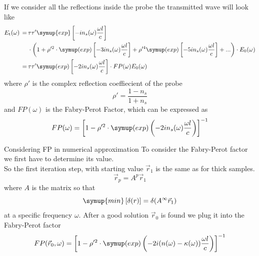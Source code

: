 \documentclass[aspectratio=1610, 9pt]{beamer}
\begin{document}
\begin{frame}
  If we consider all the reflections inside the probe the transmitted wave will look like
  \begin{align*}
    E_\text{t}(\omega) \,=\,& \tau \tau' \symup{exp} \left[-i n_s(\omega) \frac{\omega l }{c}\right] \\
                        & \cdot \left( 1 + \rho'^2 \cdot \symup(exp)\left[ -3 i n_s(\omega) \frac{\omega l }{c}\right] + \rho'^4 \symup(exp) \left[ -5 i n_s(\omega) \frac{\omega l }{c}\right] + ...\right) \cdot E_0 (\omega) \\
                        \,=\,& \tau \tau' \symup(exp)\left[ -2 i n_s(\omega) \frac{\omega l }{c}\right] \cdot FP(\omega) E_0(\omega)
  \end{align*}
  where $\rho'$ is the complex reflection coeffiecient of the probe
  \begin{equation}
    \rho' = \frac{1 - n_s}{1 + n_s}
  \end{equation}
  and $FP(\omega)$ is the Fabry-Perot Factor, which can be expressed as 
  \begin{equation}
    FP(\omega) = \left[1 - \rho'^2 \cdot \symup(exp)\left(- 2 i n_s(\omega )\frac{\omega l }{c}\right)\right]^{-1}
  \end{equation}
\end{frame}

\begin{frame}{Considering FP in numerical approximation}
  To consider the Fabry-Perot factor we first have to determine its value.\\
  So the first iteration step, with starting value $\vec{r}_1$ is the same as for thick samples.
  \begin{equation}
    \vec{r}_p = A^p \vec{r}_1
  \end{equation}  
  where $A$ is the matrix so that 
  \begin{equation}
    \symup{min} \left[ \delta(r)\right] = \delta(A^\infty \vec{r}_1)
  \end{equation}
  at a specific frequency $\omega$.
  After a good solution $\vec{r}_0$ is found we plug it into the Fabry-Perot factor
  \begin{equation}
    FP(\vec{r}_0, \omega) = \left[1 - \rho'^2 \cdot \symup(exp)\left(- 2 i (n(\omega) - \kappa(\omega))\frac{\omega l }{c}\right)\right]^{-1}
  \end{equation}
\end{frame}
\end{document}
